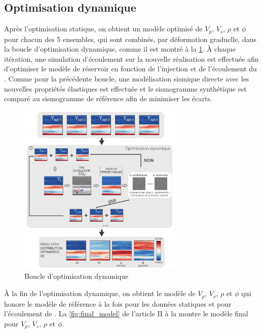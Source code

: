 \subsection{Optimisation dynamique}
Après l'optimisation statique, on obtient un modèle optimisé de $V_p$,
$V_s$, $\rho$ et $\phi$ pour chacun des 5 ensembles, qui sont combinés, par
déformation
graduelle, dans la boucle d'optimisation dynamique, comme il est montré à la
\cref{fig:2boucle}. À chaque itération, une simulation d'écoulement sur la
nouvelle réalisation est effectuée afin d'optimiser le modèle de réservoir en
fonction de l'injection et  de l'écoulement du . Comme pour la
précédente boucle, une modélisation sismique directe avec les nouvelles
propriétés élastiques est effectuée et le sismogramme synthétique est comparé au
sismogramme de référence afin de minimiser les écarts.
\begin{figure}[!ht]
\centering
\includegraphics[width=0.7\textwidth]{fig/2boucle.pdf}
\caption{Boucle d'optimisation dynamique}
\label{fig:2boucle}
\end{figure}
À la fin de l'optimisation dynamique, on obtient le modèle de $V_p$, $V_s$,
$\rho$ et $\phi$ qui honore le modèle de référence à la fois pour les données
statiques et pour l'écoulement de . La \cref{fig:final_model} de
l'article II à la  montre le modèle final pour $V_p$,
$V_s$, $\rho$ et $\phi$.
